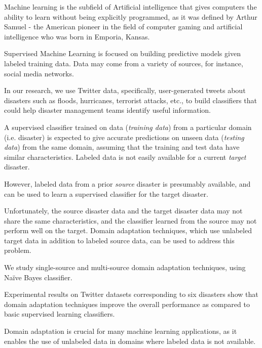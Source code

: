 
\pagestyle{empty}
\setlength{\baselineskip}{0.8cm}



Machine learning is the subfield of Artificial intelligence that gives computers the ability to learn without being explicitly programmed, as it was defined by Arthur Samuel - the American pioneer in the field of computer gaming and artificial intelligence who was born in Emporia, Kansas. 

Supervised Machine Learning is focused on building predictive models given labeled training data. Data may come from a variety of sources, for instance, social media networks. 

In our research, we use Twitter data, specifically, user-generated tweets about disasters such as floods, hurricanes, terrorist attacks, etc., to build classifiers that could help disaster management teams identify useful information. 

A supervised classifier trained on data (\textit{training data}) from a particular domain (i.e. disaster) is expected to give accurate predictions on unseen data (\textit{testing data}) from the same domain, assuming that the training and test data have similar characteristics. Labeled data is not easily available for a current \textit{target} disaster. 

However, labeled data from a prior \textit{source} disaster is presumably available, and can be used to learn a supervised classifier for the target disaster. 

Unfortunately, the source disaster data and the target disaster data may not share the same characteristics, and the classifier learned from the source may not perform well on the target. Domain adaptation techniques, which use unlabeled target data in addition to labeled source data, can be used to address this problem. 

We study single-source and multi-source domain adaptation techniques, using Naïve Bayes classifier. 

Experimental results on Twitter datasets corresponding to six disasters show that domain adaptation techniques improve the overall performance as compared to basic supervised learning classifiers. 

Domain adaptation is crucial for many machine learning applications, as it enables the use of unlabeled data in domains where labeled data is not available.

